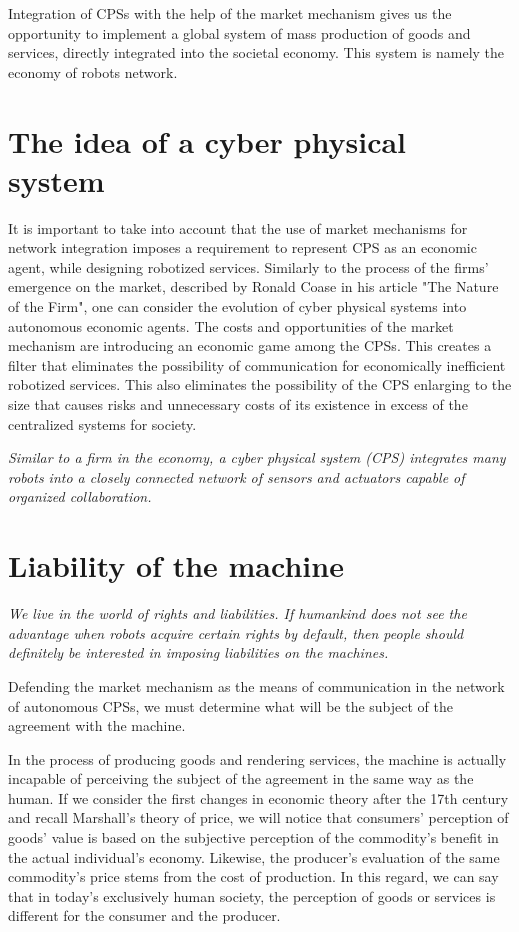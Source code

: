 \documentclass{article}
\begin{document}
Integration of CPSs with the help of the market mechanism gives us the opportunity to implement a global system of mass production of goods and services, directly integrated into the societal economy. This system is namely the economy of robots network.

\section{The idea of a cyber physical system}

It is important to take into account that the use of market mechanisms for network integration imposes a requirement to represent CPS as an economic agent, while designing robotized services. Similarly to the process of the firms’ emergence on the market, described by Ronald Coase in his article "The Nature of the Firm", one can consider the evolution of cyber physical systems into autonomous economic agents. The costs and opportunities of the market mechanism are introducing an economic game among the CPSs. This creates a filter that eliminates the possibility of communication for economically inefficient robotized services. This also eliminates the possibility of the CPS enlarging to the size that causes risks and unnecessary costs of its existence in excess of the centralized systems for society.

\textit{Similar to a firm in the economy, a cyber physical system (CPS) integrates many robots into a closely connected network of sensors and actuators capable of organized collaboration.}

\section{Liability of the machine}

\textit{We live in the world of rights and liabilities. If humankind does not see the advantage when robots acquire certain rights by default, then people should definitely be interested in imposing liabilities on the machines.}

Defending the market mechanism as the means of communication in the network of autonomous CPSs, we must determine what will be the subject of the agreement with the machine.

In the process of producing goods and rendering services, the machine is actually incapable of perceiving the subject of the agreement in the same way as the human. If we consider the first changes in economic theory after the 17th century and recall Marshall's theory of price, we will notice that consumers’ perception of goods’ value is based on the subjective perception of the commodity’s benefit in the actual individual’s economy. Likewise, the producer’s evaluation of the same commodity’s price stems from the cost of production. In this regard, we can say that in today's exclusively human society, the perception of goods or services is different for the consumer and the producer. 
\end{document}
